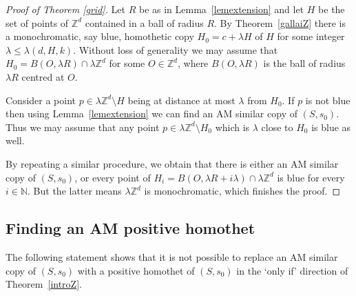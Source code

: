 \documentclass[12pt]{article}
\newcommand{\N}{{\mathbb N}}
\newcommand{\Z}{{\mathbb Z}}
\theoremstyle{plain}
\theoremstyle{definition}
\begin{document}
\begin{proof}[Proof of Theorem \ref{grid}]

Let $R$ be as in Lemma~\ref{lemextension} and let $H$ be the set of points of $\Z^d$ contained in a ball of radius $R$. By Theorem~\ref{gallaiZ} there is a monochromatic, say blue, homothetic copy $H_0=c+\lambda H$ of $H$ for some integer $\lambda\leq\lambda(d,H,k)$. Without loss of generality we may assume that $H_0=B(O, \lambda R)\cap \lambda\mathbb{Z}^d$ for some $O\in \mathbb{Z}^d$, where $B(O, \lambda R)$ is the ball of radius $\lambda R$ centred at $O$.

Consider a point $p\in \lambda \Z^d\setminus H$ being at distance at most $\lambda$ from $H_0$. If $p$ is not blue then using Lemma~\ref{lemextension} we can find an AM similar copy of $(S,s_0)$. Thus we may assume that any point $p\in \lambda \Z^d\setminus H_0$ which is $\lambda$ close to $H_0$ is blue as well. 

By repeating a similar procedure, we obtain that there is either an AM similar copy of $(S,s_0)$, or every point of $H_i=B(O,\lambda R+i \lambda )\cap \lambda\Z^d$ is blue for every $i\in \N$. But the latter means $\lambda \Z^d$ is monochromatic, which finishes the proof.
\end{proof}

\subsection{Finding an AM positive homothet}

The following statement shows that it is not possible to replace an AM similar copy of $(S,s_0)$ with a positive homothet of $(S,s_0)$ in the `only if' direction of Theorem~\ref{introZ}.
\end{document}
